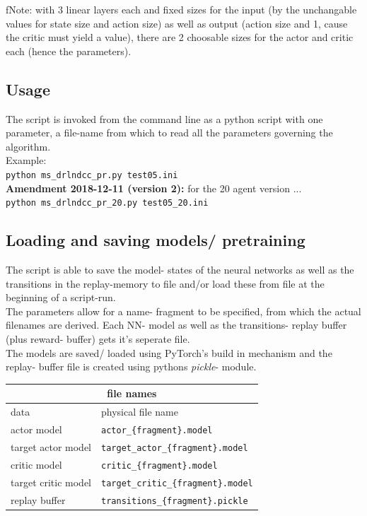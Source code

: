 \documentclass[a4paper]{article}
\begin{document}
f{Note:} with 3 linear layers each and fixed sizes for the input
(by the unchangable values for state size and action size) as well as output
(action size and 1, cause the critic must yield a value), there are 2
choosable sizes for the actor and critic each (hence the parameters).

\subsection{Usage}
The script is invoked from the command line as a python script with one parameter,
a file-name from which to read all the parameters governing the algorithm.
\\
Example:\\
\texttt{python ms\_drlndcc\_pr.py test05.ini}
\\
\textbf{Amendment 2018-12-11 (version 2):} for the 20 agent version ...\\
\texttt{python ms\_drlndcc\_pr\_20.py test05\_20.ini}

\subsection{Loading and saving models/ pretraining}
The script is able to save the model- states of the neural networks as well as
the transitions in the replay-memory to file and/or load these from file
at the beginning of a script-run.
\\
The parameters allow for a name- fragment to be specified, from which the
actual filenames are derived. Each NN- model as well as the transitions-
replay buffer (plus reward- buffer) gets it's seperate file.
\\
The models are saved/ loaded using PyTorch's build in mechanism and the
replay- buffer file is created using pythons \textit{pickle}- module.

\small
\begin{tabular}{ |l|l| }
  \hline
  \multicolumn{2}{|c|}{file names} \\
  \hline
data & physical file name \\
  \hline
actor model & \texttt{actor\_\{fragment\}.model} \\
target actor model & \texttt{target\_actor\_\{fragment\}.model} \\
critic model & \texttt{critic\_\{fragment\}.model} \\
target critic model & \texttt{target\_critic\_\{fragment\}.model} \\
replay buffer & \texttt{transitions\_\{fragment\}.pickle} \\
  \hline
\end{tabular}
\normalsize
\end{document}
